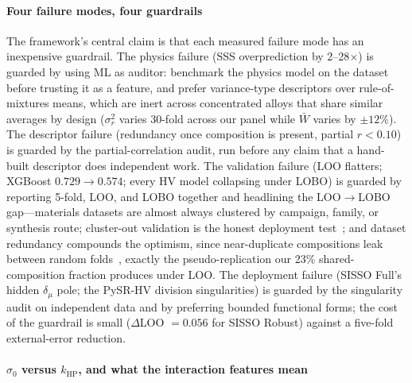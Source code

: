\documentclass[5p,times,twocolumn]{elsarticle}
\begin{document}
\paragraph{Four failure modes, four guardrails}
\label{sec:guardrails}

The framework's central claim is that each measured failure mode has an inexpensive guardrail. The physics failure (SSS overprediction by 2--28$\times$) is guarded by using ML as auditor: benchmark the physics model on the dataset before trusting it as a feature, and prefer variance-type descriptors over rule-of-mixtures means, which are inert across concentrated alloys that share similar averages by design ($\sigma_r^2$ varies 30-fold across our panel while $\bar{W}$ varies by $\pm 12\%$). The descriptor failure (redundancy once composition is present, partial $r < 0.10$) is guarded by the partial-correlation audit, run before any claim that a hand-built descriptor does independent work. The validation failure (LOO flatters; XGBoost $0.729 \to 0.574$; every HV model collapsing under LOBO) is guarded by reporting 5-fold, LOO, and LOBO together and headlining the LOO$\to$LOBO gap---materials datasets are almost always clustered by campaign, family, or synthesis route; cluster-out validation is the honest deployment test~\cite{Meredig2018}; and dataset redundancy compounds the optimism, since near-duplicate compositions leak between random folds~\cite{LiMDHIT2024}, exactly the pseudo-replication our 23\% shared-composition fraction produces under LOO. The deployment failure (SISSO Full's hidden $\delta_\mu$ pole; the PySR-HV division singularities) is guarded by the singularity audit on independent data and by preferring bounded functional forms; the cost of the guardrail is small ($\Delta$LOO $= 0.056$ for SISSO Robust) against a five-fold external-error reduction.

\paragraph{$\sigma_0$ versus $k_\text{HP}$, and what the interaction features mean}
\label{sec:sigma0_khp}
\end{document}
